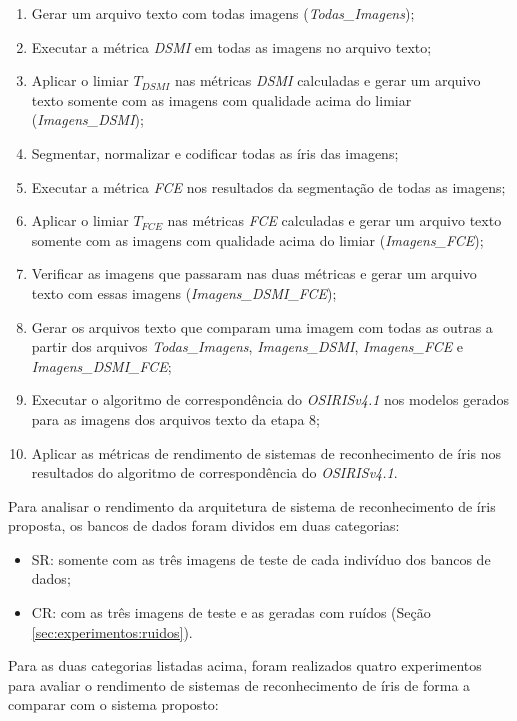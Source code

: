 \begin{enumerate}
    \item Gerar um arquivo texto com todas imagens (\textit{Todas\_Imagens});
    \item Executar a métrica \textit{\acrshort{DSMI}} em todas as imagens no arquivo texto;
    \item Aplicar o limiar $T_{DSMI}$ nas métricas \textit{\acrshort{DSMI}} calculadas e gerar um arquivo texto somente com as imagens com qualidade acima do limiar (\textit{Imagens\_DSMI});
    \item Segmentar, normalizar e codificar todas as íris das imagens;
    \item Executar a métrica \textit{\acrshort{FCE}} nos resultados da segmentação de todas as imagens;
    \item Aplicar o limiar $T_{FCE}$ nas métricas \textit{\acrshort{FCE}} calculadas e gerar um arquivo texto somente com as imagens com qualidade acima do limiar (\textit{Imagens\_FCE});
    \item Verificar as imagens que passaram nas duas métricas e gerar um arquivo texto com essas imagens (\textit{Imagens\_DSMI\_FCE});
    \item Gerar os arquivos texto que comparam uma imagem com todas as outras a partir dos arquivos \textit{Todas\_Imagens}, \textit{Imagens\_DSMI}, \textit{Imagens\_FCE} e \textit{Imagens\_DSMI\_FCE};
    \item Executar o algoritmo de correspondência do \textit{OSIRISv4.1} nos modelos gerados para as imagens dos arquivos texto da etapa 8;
    \item Aplicar as métricas de rendimento de sistemas de reconhecimento de íris nos resultados do algoritmo de correspondência do \textit{OSIRISv4.1}.
\end{enumerate}

\par Para analisar o rendimento da arquitetura de sistema de reconhecimento de íris proposta, os bancos de dados foram dividos em duas categorias:

\begin{itemize}
    \item \acrfull{SR}: somente com as três imagens de teste de cada indivíduo dos bancos de dados;
    \item \acrfull{CR}: com as três imagens de teste e as geradas com ruídos (Seção \ref{sec:experimentos:ruidos}).
\end{itemize}

\par Para as duas categorias listadas acima, foram realizados quatro experimentos para avaliar o rendimento de sistemas de reconhecimento de íris de forma a comparar com o sistema proposto:

